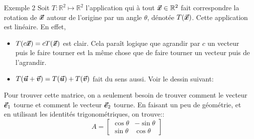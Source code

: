 \documentclass{article}
\begin{document}
\begin{parag}{Exemple 2}
    Soit $T: \mathbb{R}^2 \mapsto \mathbb{R}^2$ l'application qui à tout $\bm{\protect\vec{x}} \in \mathbb{R}^2$ fait correspondre la rotation de $\bm{\protect\vec{x}}$ autour de l'origine par un angle $\theta$, dénotée $T\left(\bvec{x}\right)$. Cette application est linéaire. En effet,
    \begin{itemize}
        \item $T\left(c \bvec{x}\right) = c T\left(\bvec{x}\right)$ est clair. Cela paraît logique que agrandir par $c$ un vecteur puis le faire tourner est la même chose que de faire tourner un vecteur puis de l'agrandir.
        \item $T\left(\bvec{u} + \bvec{v}\right) = T\left(\bvec{u}\right) + T\left(\bvec{v}\right)$ fait du sens aussi. Voir le dessin suivant:

    \end{itemize}

    Pour trouver cette matrice, on a seulement besoin de trouver comment le vecteur $\bm{\protect\vec{e}}_1$ tourne et comment le vecteur $\bm{\protect\vec{e}}_2$ tourne. En faisant un peu de géométrie, et en utilisant les identités trigonométriques, on trouve::
    \[A = \begin{bmatrix} \cos \theta & -\sin \theta \\ \sin \theta & \cos \theta \end{bmatrix} \]

\end{parag}
\end{document}
